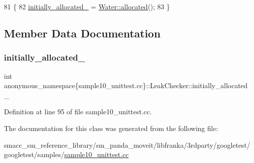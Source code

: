 \begin{DoxyCode}
81                                               \{
82     \hyperlink{classanonymous__namespace_02sample10__unittest_8cc_03_1_1LeakChecker_aa049de02dffd92c4b31d2c4964d9091f}{initially\_allocated\_} = \hyperlink{classanonymous__namespace_02sample10__unittest_8cc_03_1_1Water_aa9c7c691e2b1c95aaf3da3652d7b21fc}{Water::allocated}();
83   \}
\end{DoxyCode}


\subsection{Member Data Documentation}
\mbox{\label{classanonymous__namespace_02sample10__unittest_8cc_03_1_1LeakChecker_aa049de02dffd92c4b31d2c4964d9091f}} 
\subsubsection{\texorpdfstring{initially\+\_\+allocated\+\_\+}{initially\_allocated\_}}
{\footnotesize\ttfamily int anonymous\+\_\+namespace\{sample10\+\_\+unittest.\+cc\}\+::Leak\+Checker\+::initially\+\_\+allocated\+\_\+\hspace{0.3cm}{\ttfamily [private]}}



Definition at line 95 of file sample10\+\_\+unittest.\+cc.



The documentation for this class was generated from the following file\+:\begin{DoxyCompactItemize}
\item 
smacc\+\_\+sm\+\_\+reference\+\_\+library/sm\+\_\+panda\+\_\+moveit/libfranka/3rdparty/googletest/googletest/samples/\hyperlink{sample10__unittest_8cc}{sample10\+\_\+unittest.\+cc}\end{DoxyCompactItemize}
